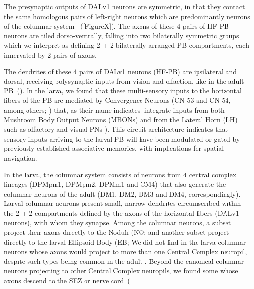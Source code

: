     The presynaptic outputs of DALv1 neurons are symmetric, in that they contact the same homologous pairs of left-right neurons which are predominantly neurons of the columnar system ~(\ref{FigureX}).
    The axons of these 4 pairs of HF-PB neurons are tiled dorso-ventrally, falling into two bilaterally symmetric groups which we interpret as defining 2 + 2 bilaterally arranged PB compartments, each innervated by 2 pairs of axons. %

    The dendrites of these 4 pairs of DALv1 neurons (HF-PB) are ipsilateral and dorsal, receiving polysynaptic inputs from vision and olfaction, like in the adult PB~(\citep{hulse2021connectome}). In the larva, we found that these multi-sensory inputs to the horizontal fibers of the PB are mediated by Convergence Neurons (CN-53 and CN-54, among others; \citealp{eschbach2021}) that, as their name indicates, integrate inputs from both Mushroom Body Output Neurons (MBONs) and from the Lateral Horn (LH) such as olfactory and visual PNs \citep{EsbachFushiki2021}). This circuit architecture indicates that sensory inputs arriving to the larval PB will have been modulated or gated by previously established associative memories, with implications for spatial navigation.



    In the larva, the columnar system consists of neurons from 4 central complex lineages (DPMpm1, DPMpm2, DPMm1 and CM4) that also generate the columnar neurons of the adult (DM1, DM2, DM3 and DM4, correspondingly).
    Larval columnar neurons present small, narrow dendrites circumscribed within the 2 + 2 compartments defined by the axons of the horizontal fibers (DALv1 neurons), with whom they synapse.
    Among the columnar neurons, a subset project their axons directly to the Noduli (NO; %
    and another subset project directly to the larval Ellipsoid Body (EB;%
    We did not find in the larva columnar neurons whose axons would project to more than one Central Complex neuropil, despite such types being common in the adult \citep{wolff2015neuroarchitecture, wolff2018neuroarchitecture, hulse2021connectome}.
    Beyond the canonical columnar neurons projecting to other Central Complex neuropils, we found some whose axons descend to the SEZ or nerve cord~(%




